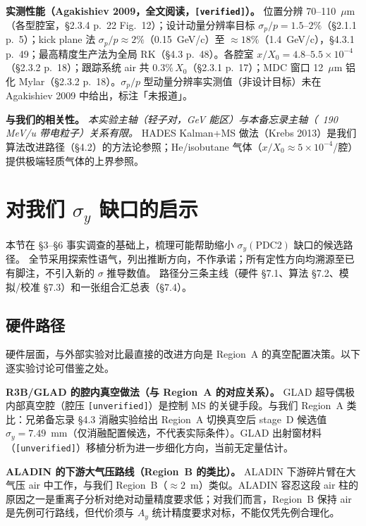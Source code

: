 \documentclass[a4paper, 11pt]{article}
\begin{document}
\textbf{实测性能（Agakishiev 2009，全文阅读，\texttt{[verified]}）。}
位置分辨 70--110~$\mu$m（各型腔室，§2.3.4 p.~22 Fig.~12）；设计动量分辨率目标 $\sigma_p/p = 1.5$--$2\%$（§2.1.1 p.~5）；kick plane 法 $\sigma_p/p \approx 2\%$（0.15~GeV/c）至 $\approx 18\%$（1.4~GeV/c），§4.3.1 p.~49；最高精度生产法为全局 RK（§4.3 p.~48）。各腔室 $x/X_0 = 4.8$--$5.5\times10^{-4}$（§2.3.2 p.~18）；跟踪系统 air 共 $0.3\%\,X_0$（§2.3.1 p.~17）；MDC 窗口 12~$\mu$m 铝化 Mylar（§2.3.2 p.~18）。$\sigma_p/p$ 型动量分辨率实测值（非设计目标）未在 Agakishiev 2009 中给出，标注「未报道」。

\textbf{与我们的相关性。}
\textit{本实验主轴（轻子对，GeV 能区）与本备忘录主轴（~190 MeV/u 带电粒子）关系有限。}
HADES Kalman+MS 做法（Krebs 2013）是我们算法改进路径（§4.2）的方法论参照；He/isobutane 气体（$x/X_0 \approx 5\times10^{-4}$/腔）提供极端轻质气体的上界参照。

\section{对我们 \texorpdfstring{$\sigma_y$}{sigma\_y} 缺口的启示}

本节在 §3--§6 事实调查的基础上，梳理可能帮助缩小 $\sigma_y(\text{PDC2})$ 缺口的候选路径。
全节采用探索性语气，列出推断方向，不作承诺；所有定性方向均溯源至已有脚注，不引入新的 $\sigma$ 推导数值。
路径分三条主线（硬件 §7.1、算法 §7.2、模拟/校准 §7.3）和一张组合汇总表（§7.4）。

\subsection{硬件路径}\label{sec:imp_hardware}
\label{sec:impl_hardware}

硬件层面，与外部实验对比最直接的改进方向是 Region~A 的真空配置决策。以下逐实验讨论可借鉴之处。

\textbf{R3B/GLAD 的腔内真空做法（与 Region~A 的对应关系）。}
GLAD 超导偶极内部真空腔（腔压 \texttt{[unverified]}）是控制 MS 的关键手段。与我们 Region~A 类比：兄弟备忘录 §4.3 消融实验给出 Region~A 切换真空后 stage~D 候选值 $\sigma_y = 7.49$~mm（仅消融配置候选，不代表实际条件）。GLAD 出射窗材料（\texttt{[unverified]}）移植分析为进一步细化方向，当前无定量估计。

\textbf{ALADIN 的下游大气压路线（Region~B 的类比）。}
ALADIN 下游碎片臂在大气压 air 中工作，与我们 Region~B（$\approx 2$~m）类似。ALADIN 容忍这段 air 柱的原因之一是重离子分析对绝对动量精度要求低；对我们而言，Region~B 保持 air 是先例可行路线，但代价须与 $A_y$ 统计精度要求对标，不能仅凭先例合理化。
\end{document}
